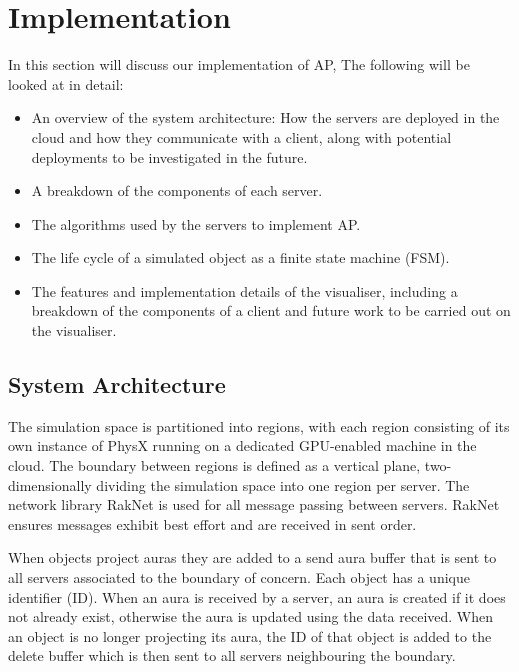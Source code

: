 \chapter{Implementation}
In this section will discuss our implementation of AP, The following will be looked at in detail: \begin{itemize}
	\item An overview of the system architecture: How the servers are deployed in the cloud and how they communicate with a client, along with potential deployments to be investigated in the future.
	\item A breakdown of the components of each server.
	\item The algorithms used by the servers to implement AP.
	\item The life cycle of a simulated object as a finite state machine (FSM).
	\item The features and implementation details of the visualiser, including a breakdown of the components of a client and future work to be carried out on the visualiser.
\end{itemize}


\section{System Architecture}
The simulation space is partitioned into regions, with each region consisting of its own instance of PhysX running on a dedicated GPU-enabled machine in the cloud. The boundary between regions is defined as a vertical plane, two-dimensionally dividing the simulation space into one region per server. The network library RakNet is used for all message passing between servers. RakNet ensures messages exhibit best effort and are received in sent order.

When objects project auras they are added to a send aura buffer that is sent to all servers associated to the boundary of concern. Each object has a unique identifier (ID). When an aura is received by a server, an aura is created if it does not already exist, otherwise the aura is updated using the data received. When an object is no longer projecting its aura, the ID of that object is added to the delete buffer which is then sent to all servers neighbouring the boundary.

